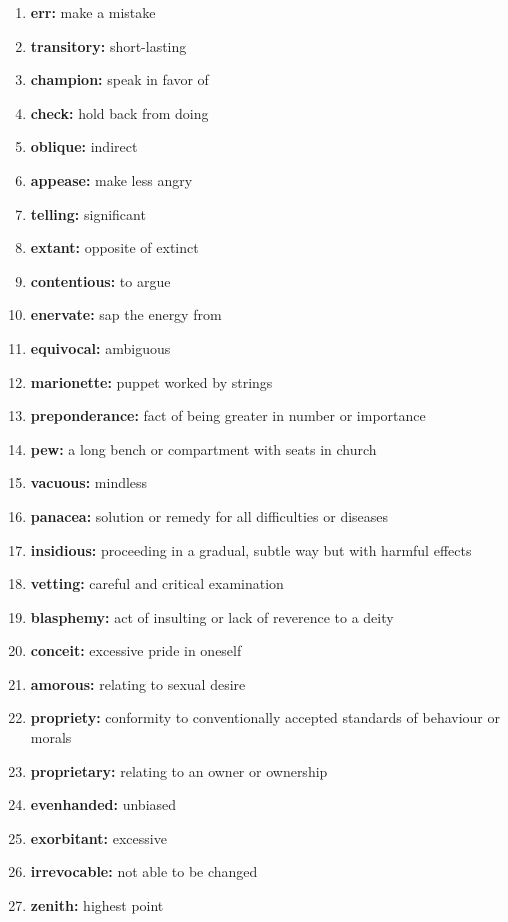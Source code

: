 \documentclass{article}
\begin{document}
\begin{enumerate}
    \item \textbf{err: }{make a mistake}
    \item \textbf{transitory: }{short-lasting}
    \item \textbf{champion: }{speak in favor of}
    \item \textbf{check: }{hold back from doing}
    \item \textbf{oblique: }{indirect}
    \item \textbf{appease: }{make less angry}
    \item \textbf{telling: }{significant}
    \item \textbf{extant: }{opposite of extinct}
    \item \textbf{contentious: }{to argue}
    \item \textbf{enervate: }{sap the energy from}
    \item \textbf{equivocal: }{ambiguous}
    \item \textbf{marionette: }{puppet worked by strings}
    \item \textbf{preponderance: }{fact of being greater in number or importance}
    \item \textbf{pew: }{a long bench or compartment with seats in church}
    \item \textbf{vacuous: }{mindless}
    \item \textbf{panacea: }{solution or remedy for all difficulties or diseases}
    \item \textbf{insidious: }{proceeding in a gradual, subtle way but with harmful effects}
    \item \textbf{vetting: }{careful and critical examination}
    \item \textbf{blasphemy: }{act of insulting or lack of reverence to a deity}
    \item \textbf{conceit: }{excessive pride in oneself}
    \item \textbf{amorous: }{relating to sexual desire}
    \item \textbf{propriety: }{conformity to conventionally accepted standards of behaviour or morals}
    \item \textbf{proprietary: }{relating to an owner or ownership}
    \item \textbf{evenhanded: }{unbiased}
    \item \textbf{exorbitant: }{excessive}
    \item \textbf{irrevocable: }{not able to be changed}
    \item \textbf{zenith: }{highest point}

\end{enumerate}
\end{document}
